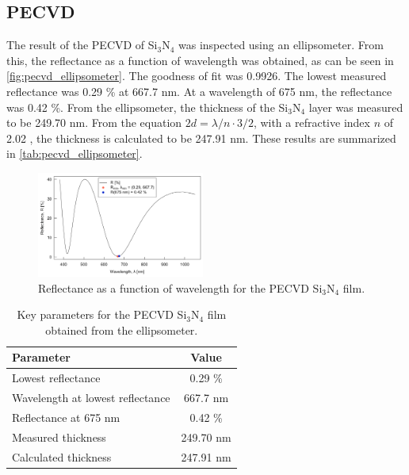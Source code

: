 \subsection{PECVD}

The result of the PECVD of Si$_3$N$_4$ was inspected using an ellipsometer.
From this, the reflectance as a function of wavelength was obtained, as can be seen in \autoref{fig:pecvd_ellipsometer}.
The goodness of fit was 0.9926.
The lowest measured reflectance was 0.29 \% at 667.7 nm. 
At a wavelength of 675 nm, the reflectance was 0.42 \%.
From the ellipsometer, the thickness of the Si$_3$N$_4$ layer was measured to be 249.70 nm.
From the equation $2 d = \lambda / n \cdot 3 / 2$, with a refractive index $n$ of 2.02 \cite{ref_index_Si3N4}, the thickness is calculated to be 247.91 nm. 
These results are summarized in \autoref{tab:pecvd_ellipsometer}.

\begin{figure}
    \centering
    \includegraphics[width=0.49\textwidth]{figures/PECVD_elips.png}
    \caption{Reflectance as a function of wavelength for the PECVD Si$_3$N$_4$ film.}
    \label{fig:pecvd_ellipsometer}
\end{figure}

\begin{table}
    \centering
    \caption{Key parameters for the PECVD Si$_3$N$_4$ film obtained from the ellipsometer.}
    \label{tab:pecvd_ellipsometer}
    \begin{tabular}{lc}
    \hline
    \textbf{Parameter}               & \textbf{Value} \\ \hline
    Lowest reflectance               & 0.29 \%        \\
    Wavelength at lowest reflectance & 667.7 nm       \\
    Reflectance at 675 nm            &  0.42 \%       \\
    Measured thickness               & 249.70 nm      \\
    Calculated thickness             & 247.91 nm      \\ \hline
    \end{tabular}
\end{table}


